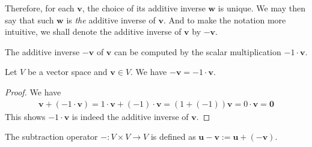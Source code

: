 \documentclass[thmcnt=section, color=cyan, 12pt]{my-elegantbook}
\begin{document}
Therefore, for each $\mathbf{v}$, the choice of its
additive inverse $\mathbf{w}$ is unique.
We may then say that such $\mathbf{w}$ is \textit{the} additive inverse of $\mathbf{v}$.
And to make the notation more intuitive, we shall denote
the additive inverse of $\mathbf{v}$ by $-\mathbf{v}$.

The additive inverse $-\mathbf{v}$ of $\mathbf{v}$ can be computed by
the scalar multiplication $-1 \cdot \mathbf{v}$.

\begin{proposition}
	Let $V$ be a vector space and $\mathbf{v} \in V$.
	We have $-\mathbf{v} = -1 \cdot \mathbf{v}$.
\end{proposition}

\begin{proof}
	We have
	\begin{align*}
		\mathbf{v} + (-1 \cdot \mathbf{v}) = 1 \cdot \mathbf{v} + (-1) \cdot \mathbf{v}
		= (1 + (-1)) \mathbf{v}
		= 0 \cdot \mathbf{v}
		= \mathbf{0}
	\end{align*}
	This shows $-1 \cdot \mathbf{v}$ is indeed the additive inverse of $\mathbf{v}$.
\end{proof}

The subtraction operator $-: V \times V \to V$ is defined
as $\mathbf{u} - \mathbf{v} := \mathbf{u} + (-\mathbf{v})$.




\printbibliography[heading=bibintoc, title=References]


\printindex
\end{document}
